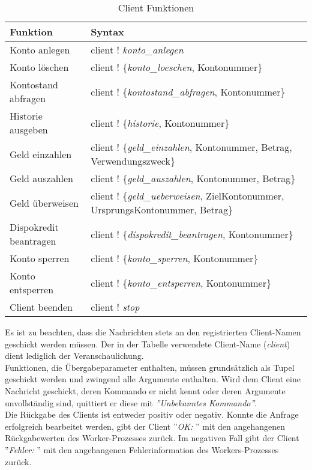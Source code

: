 \begin{table}[H]
\caption{Client Funktionen}
\begin{center}
\begin{tabular}[t]{l|l}
\textbf{Funktion} 	& \textbf{Syntax} \\
\hline
\hline
Konto anlegen 			& client ! \textit{konto\_anlegen}\\
\hline
Konto löschen 			& client ! \{\textit{konto\_loeschen}, Kontonummer\}\\
\hline
Kontostand abfragen 	& client ! \{\textit{kontostand\_abfragen}, Kontonummer\}\\
\hline
Historie ausgeben 		& client ! \{\textit{historie}, Kontonummer\}\\
\hline
Geld einzahlen			& client ! \{\textit{geld\_einzahlen}, Kontonummer, Betrag, Verwendungszweck\}\\
\hline
Geld auszahlen 			& client ! \{\textit{geld\_auszahlen}, Kontonummer, Betrag\}\\
\hline
Geld überweisen 		& client ! \{\textit{geld\_ueberweisen}, ZielKontonummer,
UrsprungsKontonummer, Betrag\}\\
\hline
Dispokredit beantragen 	& client ! \{\textit{dispokredit\_beantragen}, Kontonummer\}\\
\hline
Konto sperren 			& client ! \{\textit{konto\_sperren}, Kontonummer\}\\
\hline
Konto entsperren 		& client ! \{\textit{konto\_entsperren}, Kontonummer\}\\
\hline
Client beenden 			& client ! \textit{stop}
\end{tabular}
\end{center}
\end{table}
$\;$ \\
Es ist zu beachten, dass die Nachrichten stets an den registrierten Client-Namen geschickt werden müssen. Der in der Tabelle verwendete Client-Name (\textit{client}) dient lediglich der Veranschaulichung.\\
Funktionen, die Übergabeparameter enthalten, müssen grundsätzlich als Tupel geschickt werden und zwingend alle Argumente enthalten. Wird dem Client eine Nachricht geschickt, deren Kommando er nicht kennt oder deren Argumente unvollständig sind, quittiert er diese mit \textit{''Unbekanntes Kommando''}.\\
Die Rückgabe des Clients ist entweder positiv oder negativ. Konnte die Anfrage erfolgreich bearbeitet werden, gibt der Client ''\textit{OK: }'' mit den angehangenen Rückgabewerten des Worker-Prozesses zurück. Im negativen Fall gibt der Client ''\textit{Fehler: }'' mit den angehangenen Fehlerinformation des Workers-Prozesses zurück.\\
